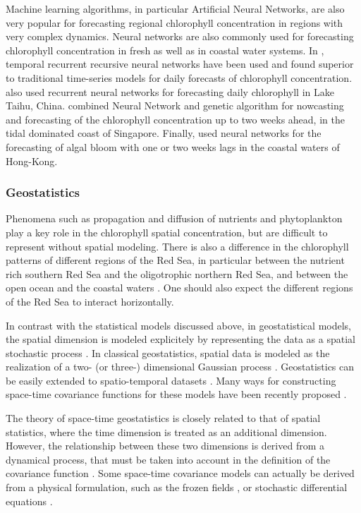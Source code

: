 Machine learning algorithms, in particular Artificial Neural Networks,
are also very popular for forecasting regional chlorophyll concentration in regions
with very complex dynamics. Neural networks are also commonly used for forecasting
chlorophyll concentration in fresh as well as in coastal water systems. In
\citet{Jeong2006}, temporal recurrent recursive neural networks have been used
and found superior to traditional time-series models for daily forecasts of
chlorophyll concentration.  \citet{Wang2013} also used recurrent neural
networks for forecasting daily chlorophyll in Lake Taihu, China.
\citet{Mulia2013} combined Neural Network and genetic algorithm for nowcasting
and forecasting of the chlorophyll concentration up to two weeks ahead, in the
tidal dominated coast of Singapore.  Finally, \citet{Lee2003} used neural
networks for the forecasting of algal bloom with one or two weeks lags in the
coastal waters of Hong-Kong.

\subsubsection{Geostatistics}

Phenomena such as propagation and diffusion of nutrients and phytoplankton
play a key role in the chlorophyll
spatial concentration, but are difficult to represent without spatial modeling.
There is also a difference in the chlorophyll patterns of different regions of
the Red Sea, in particular between the nutrient rich southern Red Sea and the
oligotrophic northern Red Sea, and between the open ocean and the coastal
waters \citep{Raitsos2013}.  One should also expect the different regions of
the Red Sea to interact horizontally.

In contrast with the statistical models discussed above, in geostatistical
models, the spatial dimension is modeled explicitely by representing the data
as a spatial stochastic process \citep{Gneiting2007}. In classical
geostatistics, spatial data is modeled as the realization of a two- (or three-)
dimensional Gaussian process \citep{Gneiting2007}.  Geostatistics can be easily
extended to spatio-temporal datasets \citep{Gneiting2007}. Many ways for
constructing space-time covariance functions for these models have been
recently proposed \citep{Gneiting2002, Cressie1999, Stein2005}.

The theory of space-time geostatistics is closely related to that of spatial
statistics, where the time dimension is treated as an additional dimension.
However, the relationship between these two dimensions is derived from a
dynamical process, that must be taken into account in the definition of the
covariance function \citep{Gneiting2010}. Some space-time covariance models can
actually be derived from a physical formulation, such as the frozen fields
\citep{Gneiting2010}, or stochastic differential equations \citep{Brown2000,
North2011}.

